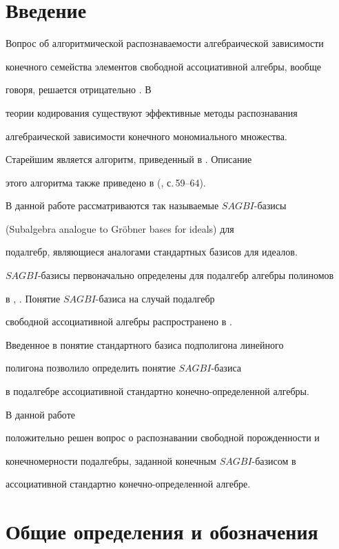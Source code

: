 \section*{Введение}





Вопрос об алгоритмической распознаваемости алгебраической зависимости


конечного семейства элементов свободной ассоциативной алгебры, вообще


говоря, решается отрицательно \cite{umirb}. В


теории кодирования существуют эффективные методы распознавания


алгебраической зависимости конечного мономиального множества.


Старейшим является алгоритм, приведенный в \cite{sardi}. Описание


этого алгоритма также приведено в (\cite{salom}, с.\,59--64).


В данной работе рассматриваются так называемые $SAGBI$-базисы


(Subalgebra analogue to Gr\"obner bases for ideals) для


подалгебр, являющиеся аналогами стандартных базисов для идеалов.


$SAGBI$-базисы первоначально определены для подалгебр алгебры полиномов


в \cite{robbsw}, \cite{kapmad}. Понятие $SAGBI$-базиса на случай подалгебр


свободной ассоциативной алгебры распространено в \cite{iyy2}. 


Введенное в \cite{lat3} понятие стандартного базиса подполигона линейного


полигона позволило определить понятие $SAGBI$-базиса


в подалгебре ассоциативной стандартно конечно-определенной алгебры.


В данной работе


положительно решен вопрос о распознавании свободной порожденности  и


конечномерности подалгебры, заданной конечным $SAGBI$-базисом в 


ассоциативной стандартно конечно-определенной алгебре.








\section{Общие определения и обозначения}





